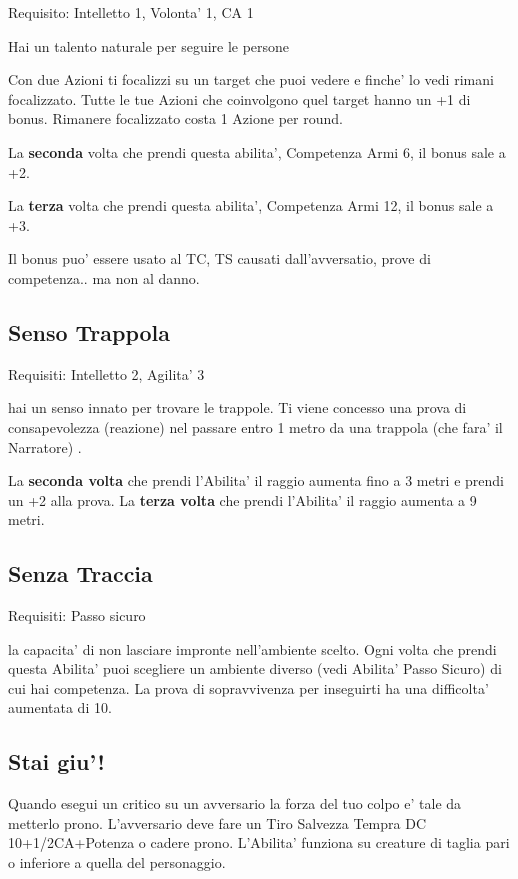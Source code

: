 \documentclass[a4paper,11pt,twoside,openany]{book}
\begin{document}
Requisito: Intelletto 1, Volonta' 1, CA 1

Hai un talento naturale per seguire le persone

Con due Azioni ti focalizzi su un target che puoi vedere e finche' lo vedi rimani focalizzato. Tutte le tue Azioni che coinvolgono quel target hanno un +1 di bonus. Rimanere focalizzato costa 1 Azione per round.

La \textbf{seconda} volta che prendi questa abilita', Competenza Armi 6, il bonus sale a +2.

La \textbf{terza} volta che prendi questa abilita', Competenza Armi 12, il bonus sale a +3.

Il bonus puo' essere usato al TC, TS causati dall'avversatio, prove di competenza.. ma non al danno.

\subsection{Senso Trappola}

Requisiti: Intelletto 2, Agilita' 3

hai un senso innato per trovare le trappole. Ti viene concesso una prova di consapevolezza (reazione) nel passare entro 1 metro da una trappola (che fara' il Narratore) .

La \textbf{seconda volta} che prendi l'Abilita' il raggio aumenta fino a 3 metri e prendi un +2 alla prova. La \textbf{terza volta} che prendi l'Abilita' il raggio aumenta a 9 metri.

\subsection{Senza Traccia}

Requisiti: Passo sicuro

la capacita' di non lasciare impronte nell'ambiente scelto. Ogni volta che prendi questa Abilita' puoi scegliere un ambiente diverso (vedi Abilita' Passo Sicuro) di cui hai competenza. La prova di sopravvivenza per inseguirti ha una difficolta' aumentata di 10.

\subsection{Stai giu'!}

Quando esegui un critico su un avversario la forza del tuo colpo e' tale da metterlo prono. L'avversario deve fare un Tiro Salvezza Tempra DC 10+1/2CA+Potenza o cadere prono. L'Abilita' funziona su creature di taglia pari o inferiore a quella del personaggio.
\end{document}
